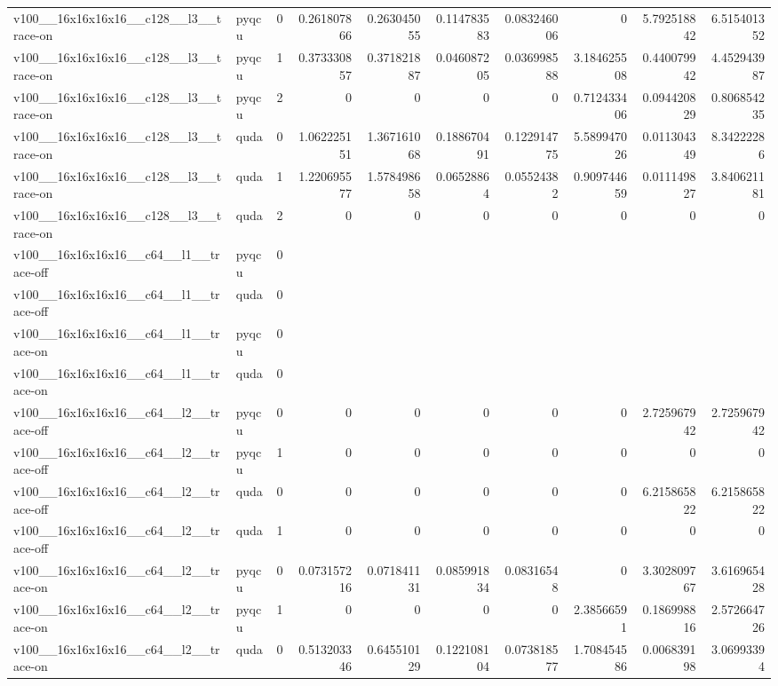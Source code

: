 \begin{table}[htbp]
\begin{tabular}{@{}llrrrrrrrr@{}}
v100\_\_16x16x16x16\_\_c128\_\_l3\_\_trace-on & pyqcu & 0 & 0.261807866 & 0.263045055 & 0.114783583 & 0.083246006 & 0 & 5.792518842 & 6.515401352 \\
v100\_\_16x16x16x16\_\_c128\_\_l3\_\_trace-on & pyqcu & 1 & 0.373330857 & 0.371821887 & 0.046087205 & 0.036998588 & 3.184625508 & 0.440079942 & 4.452943987 \\
v100\_\_16x16x16x16\_\_c128\_\_l3\_\_trace-on & pyqcu & 2 & 0 & 0 & 0 & 0 & 0.712433406 & 0.094420829 & 0.806854235 \\
v100\_\_16x16x16x16\_\_c128\_\_l3\_\_trace-on & quda & 0 & 1.062225151 & 1.367161068 & 0.188670491 & 0.122914775 & 5.589947026 & 0.011304349 & 8.34222286 \\
v100\_\_16x16x16x16\_\_c128\_\_l3\_\_trace-on & quda & 1 & 1.220695577 & 1.578498658 & 0.06528864 & 0.05524382 & 0.909744659 & 0.011149827 & 3.840621181 \\
v100\_\_16x16x16x16\_\_c128\_\_l3\_\_trace-on & quda & 2 & 0 & 0 & 0 & 0 & 0 & 0 & 0 \\
v100\_\_16x16x16x16\_\_c64\_\_l1\_\_trace-off & pyqcu & 0 &  &  &  &  &  &  &  \\
v100\_\_16x16x16x16\_\_c64\_\_l1\_\_trace-off & quda & 0 &  &  &  &  &  &  &  \\
v100\_\_16x16x16x16\_\_c64\_\_l1\_\_trace-on & pyqcu & 0 &  &  &  &  &  &  &  \\
v100\_\_16x16x16x16\_\_c64\_\_l1\_\_trace-on & quda & 0 &  &  &  &  &  &  &  \\
v100\_\_16x16x16x16\_\_c64\_\_l2\_\_trace-off & pyqcu & 0 & 0 & 0 & 0 & 0 & 0 & 2.725967942 & 2.725967942 \\
v100\_\_16x16x16x16\_\_c64\_\_l2\_\_trace-off & pyqcu & 1 & 0 & 0 & 0 & 0 & 0 & 0 & 0 \\
v100\_\_16x16x16x16\_\_c64\_\_l2\_\_trace-off & quda & 0 & 0 & 0 & 0 & 0 & 0 & 6.215865822 & 6.215865822 \\
v100\_\_16x16x16x16\_\_c64\_\_l2\_\_trace-off & quda & 1 & 0 & 0 & 0 & 0 & 0 & 0 & 0 \\
v100\_\_16x16x16x16\_\_c64\_\_l2\_\_trace-on & pyqcu & 0 & 0.073157216 & 0.071841131 & 0.085991834 & 0.08316548 & 0 & 3.302809767 & 3.616965428 \\
v100\_\_16x16x16x16\_\_c64\_\_l2\_\_trace-on & pyqcu & 1 & 0 & 0 & 0 & 0 & 2.38566591 & 0.186998816 & 2.572664726 \\
v100\_\_16x16x16x16\_\_c64\_\_l2\_\_trace-on & quda & 0 & 0.513203346 & 0.645510129 & 0.122108104 & 0.073818577 & 1.708454586 & 0.006839198 & 3.06993394 \\

\end{tabular}
\end{table}
